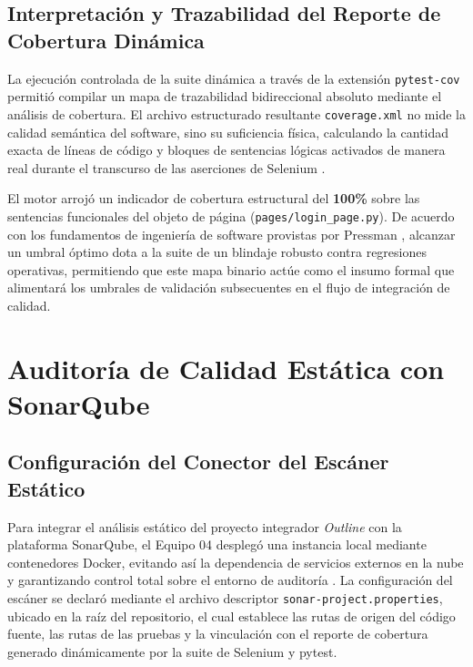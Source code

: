 \documentclass[12pt,oneside]{report}
\begin{document}
\section{Interpretación y Trazabilidad del Reporte de Cobertura Dinámica}
La ejecución controlada de la suite dinámica a través de la extensión \texttt{pytest-cov} permitió compilar un mapa de trazabilidad bidireccional absoluto mediante el análisis de cobertura. El archivo estructurado resultante \texttt{coverage.xml} no mide la calidad semántica del software, sino su suficiencia física, calculando la cantidad exacta de líneas de código y bloques de sentencias lógicas activados de manera real durante el transcurso de las aserciones de Selenium \parencite{sommerville2011}.

El motor arrojó un indicador de cobertura estructural del \textbf{100\%} sobre las sentencias funcionales del objeto de página (\texttt{pages/login\_page.py}). De acuerdo con los fundamentos de ingeniería de software provistas por Pressman \parencite{pressman2014}, alcanzar un umbral óptimo dota a la suite de un blindaje robusto contra regresiones operativas, permitiendo que este mapa binario actúe como el insumo formal que alimentará los umbrales de validación subsecuentes en el flujo de integración de calidad.


\chapter{Auditoría de Calidad Estática con SonarQube}

\section{Configuración del Conector del Escáner Estático}

Para integrar el análisis estático del proyecto integrador \textit{Outline} con la plataforma SonarQube, el Equipo 04 desplegó una instancia local mediante contenedores Docker, evitando así la dependencia de servicios externos en la nube y garantizando control total sobre el entorno de auditoría \parencite{pressman2014}. La configuración del escáner se declaró mediante el archivo descriptor \texttt{sonar-project.properties}, ubicado en la raíz del repositorio, el cual establece las rutas de origen del código fuente, las rutas de las pruebas y la vinculación con el reporte de cobertura generado dinámicamente por la suite de Selenium y pytest.
\end{document}
